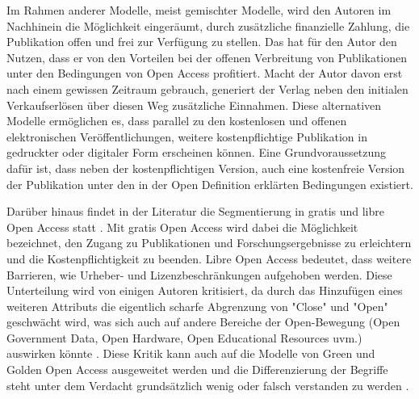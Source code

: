 Im Rahmen anderer Modelle, meist gemischter Modelle, wird den Autoren im Nachhinein die Möglichkeit eingeräumt, durch zusätzliche finanzielle Zahlung, die Publikation offen und frei zur Verfügung zu stellen\cite{lewis_2012_inevitability}. Das hat für den Autor den Nutzen, dass er von den Vorteilen bei der offenen Verbreitung von Publikationen unter den Bedingungen von Open Access profitiert. Macht der Autor davon erst nach einem gewissen Zeitraum gebrauch, generiert der Verlag neben den initialen Verkaufserlösen über diesen Weg zusätzliche Einnahmen. Diese alternativen Modelle ermöglichen es, dass parallel zu den kostenlosen und offenen elektronischen Veröffentlichungen, weitere kostenpflichtige Publikation in gedruckter oder digitaler Form erscheinen können. Eine Grundvoraussetzung dafür ist, dass neben der kostenpflichtigen Version, auch eine kostenfreie Version der Publikation unter den in der Open Definition erklärten Bedingungen existiert.

Darüber hinaus findet in der Literatur die Segmentierung in gratis und libre Open Access statt \cite{Martin_2013} \cite{naeder_2010_open} \cite{Mounce_2015}. Mit gratis Open Access wird dabei die Möglichkeit bezeichnet, den Zugang zu Publikationen und Forschungsergebnisse zu erleichtern und die Kostenpflichtigkeit zu beenden. Libre Open Access bedeutet, dass weitere Barrieren, wie Urheber- und Lizenzbeschränkungen aufgehoben werden. \cite{Adema_2014_open_access} Diese Unterteilung wird von einigen Autoren kritisiert, da durch das Hinzufügen eines weiteren Attributs die eigentlich scharfe Abgrenzung von "Close" und "Open" geschwächt wird, was sich auch auf andere Bereiche der Open-Bewegung (Open Government Data, Open Hardware, Open Educational Resources‎ uvm.) auswirken könnte \cite{suchen}. Diese Kritik kann auch auf die Modelle von Green und Golden Open Access ausgeweitet werden und die Differenzierung der Begriffe steht unter dem Verdacht grundsätzlich wenig oder falsch verstanden zu werden \cite{Mounce_2015}.


